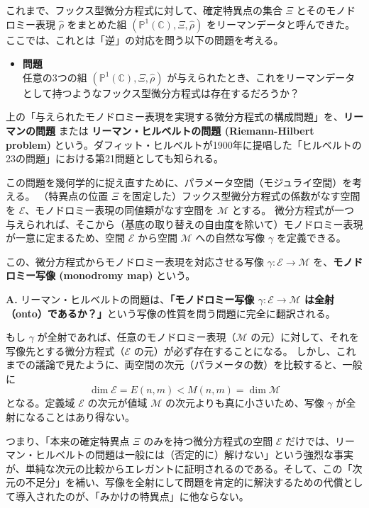 これまで、フックス型微分方程式に対して、確定特異点の集合 $\Xi$ とそのモノドロミー表現 $\hat{\rho}$ をまとめた組 $(\mathbb{P}^{1}(\mathbb{C}), \Xi, \hat{\rho})$ をリーマンデータと呼んできた。ここでは、これとは「逆」の対応を問う以下の問題を考える。

\begin{itemize}
    \item[] \textbf{問題} \\
    任意の3つの組 $(\mathbb{P}^{1}(\mathbb{C}), \Xi, \hat{\rho})$ が与えられたとき、これをリーマンデータとして持つようなフックス型微分方程式は存在するだろうか？
\end{itemize}

\begin{definition}
    上の「与えられたモノドロミー表現を実現する微分方程式の構成問題」を、\textbf{リーマンの問題} または \textbf{リーマン・ヒルベルトの問題 (Riemann-Hilbert problem)} という。ダフィット・ヒルベルトが1900年に提唱した「ヒルベルトの23の問題」における第21問題としても知られる。
\end{definition}

この問題を幾何学的に捉え直すために、パラメータ空間（モジュライ空間）を考える。
（特異点の位置 $\Xi$ を固定した）フックス型微分方程式の係数がなす空間を $\mathcal{E}$、モノドロミー表現の同値類がなす空間を $\mathcal{M}$ とする。
微分方程式が一つ与えられれば、そこから（基底の取り替えの自由度を除いて）モノドロミー表現が一意に定まるため、空間 $\mathcal{E}$ から空間 $\mathcal{M}$ への自然な写像 $\gamma$ を定義できる。

\begin{definition}[モノドロミー写像]
    この、微分方程式からモノドロミー表現を対応させる写像 $\gamma : \mathcal{E} \to \mathcal{M}$ を、\textbf{モノドロミー写像 (monodromy map)} という。
\end{definition}

\begin{Q}
\textbf{A.} リーマン・ヒルベルトの問題は、\textbf{「モノドロミー写像 $\gamma : \mathcal{E} \to \mathcal{M}$ は全射（onto）であるか？」}という写像の性質を問う問題に完全に翻訳される。

もし $\gamma$ が全射であれば、任意のモノドロミー表現（$\mathcal{M}$ の元）に対して、それを写像先とする微分方程式（$\mathcal{E}$ の元）が必ず存在することになる。
しかし、これまでの議論で見たように、両空間の次元（パラメータの数）を比較すると、一般に
\[
\dim \mathcal{E} = E(n,m) < M(n,m) = \dim \mathcal{M}
\]
となる。定義域 $\mathcal{E}$ の次元が値域 $\mathcal{M}$ の次元よりも真に小さいため、写像 $\gamma$ が全射になることはあり得ない。

つまり、「本来の確定特異点 $\Xi$ のみを持つ微分方程式の空間 $\mathcal{E}$ だけでは、リーマン・ヒルベルトの問題は一般には（否定的に）解けない」という強烈な事実が、単純な次元の比較からエレガントに証明されるのである。そして、この「次元の不足分」を補い、写像を全射にして問題を肯定的に解決するための代償として導入されたのが、「みかけの特異点」に他ならない。
\end{Q}

